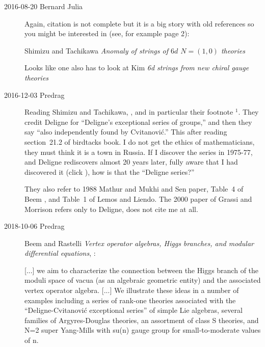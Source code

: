 \begin{description}
\item[2016-08-20 Bernard Julia]
Again, citation is not complete but it is a big story with old references
so you might be interested in (see, for example page 2):

Shimizu and Tachikawa
{\em Anomaly of strings of {$6d$ $N = (1,0)$} theories}

Looks like one also has to look at
Kim \etal{} {\em {6d} strings from new chiral gauge theories}

\item[2016-12-03 Predrag]
Reading Shimizu and Tachikawa, ,
and in particular their footnote $^1$.
They credit Deligne for ``Deligne's exceptional series of groups,'' and then
they say ``also independently found by Cvitanovi\'c.'' This after reading
section~21.2 of birdtacks book. I do not get the ethics of
mathematicians, they must think it is a town in Russia. If I discover the
series in 1975-77, and Deligne rediscovers almost 20 years
later, fully aware that I had discovered it (click
), how is that the
``Deligne series?''

They also refer to {1988} Mathur and Mukhi and Sen paper,
Table~4 of Beem \etal{}, and Table~1 of Lemos and
Liendo. The 2000 paper of Grassi and Morrison
refers only to Deligne, does not cite me at all.

\item[2018-10-06 Predrag]
Beem and Rastelli
{\em Vertex operator algebras, {Higgs} branches, and modular differential equations},
:

[...] we aim to characterize the connection between the Higgs branch of the
moduli space of vacua (as an algebraic geometric entity) and the associated
vertex operator algebra.
[...] We illustrate these ideas in a number of examples including a series of
rank-one theories associated with the ``Deligne-Cvitanovi\'c exceptional series''
of simple Lie algebras, several families of Argyres-Douglas theories, an
assortment of class S theories, and N=2 super Yang-Mills with su(n) gauge group
for small-to-moderate values of n.


\end{description}
